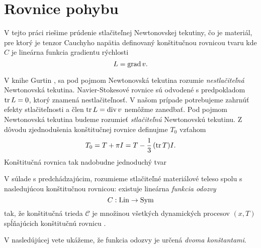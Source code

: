 \chapter{Rovnice pohybu}

V tejto práci riešime prúdenie stlačiteľnej Newtonovskej tekutiny, čo je
materiál, pre ktorý je tenzor Cauchyho napätia definovaný konštitučnou rovnicou tvaru
kde $C$ je lineárna funkcia gradientu rýchlosti $$L=\mbox{grad}\,v.$$

V knihe Gurtin \cite[s. 147]{gurtin}, sa pod pojmom Newtonovská tekutina rozumie {\it
nestlačiteľná} Newtonovská tekutina. Navier-Stokesové rovnice sú odvodené s
predpokladom $\mbox{tr}\,L=0$, ktorý znamená nestlačiteľnosť. V našom prípade
potrebujeme zahrnúť efekty stlačiteľnosti a člen $\mbox{tr}\,L=\mbox{div}\,v$ nemôžme
zanedbať. Pod pojmom Newtonovská tekutina budeme rozumieť {\it stlačiteľnú} Newtonovskú
tekutinu.
Z dôvodu zjednodušenia konštitučnej rovnice definujme  $T_0$ vzťahom
$$T_0=T+\pi I=T-\frac{1}{3}\,(\mbox{tr}\,T)I.$$
Konštitučná rovnica  tak nadobudne jednoduchý tvar

V súlade s predchádzajúcim,  rozumieme
stlačiteľné materiálové teleso spolu s nasledujúcou konštitučnou rovnicou: 
existuje lineárna {\it funkcia odozvy} $$C:\mbox{Lin} \rightarrow \mbox{Sym}$$ tak, že 
konštitučná trieda $\mathcal C$ je množinou všetkých dynamických procesov $(x,T)$ 
spĺňajúcich konštitučnú rovnicu .

V nasledújúcej vete ukážeme, že funkcia odozvy je určená {\it dvoma konštantami}. 

